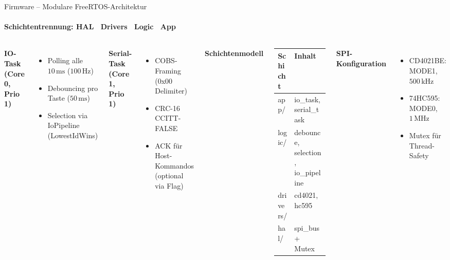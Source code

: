 \begin{frame}{Firmware -- Modulare FreeRTOS-Architektur}
\framesubtitle{Schichtentrennung: HAL \textbullet\ Drivers \textbullet\ Logic \textbullet\ App}

\begin{columns}[T,onlytextwidth]
\textbf{\textcolor{ArduinoTeal}{IO-Task} (Core 0, Prio 1)}
\begin{itemize}
  \item Polling alle $10\,\mathrm{ms}$ ($100\,\mathrm{Hz}$)
  \item Debouncing pro Taste ($50\,\mathrm{ms}$)
  \item Selection via IoPipeline (LowestIdWins)
\end{itemize}

\vspace{0.3cm}
\textbf{\textcolor{ArduinoDark}{Serial-Task} (Core 1, Prio 1)}
\begin{itemize}
  \item COBS-Framing (0x00 Delimiter)
  \item CRC-16 CCITT-FALSE
  \item ACK f\"{u}r Host-Kommandos (optional via Flag)
\end{itemize}

\textbf{Schichtenmodell}
\begin{table}
\small
\begin{tabular}{@{}ll@{}}
\toprule
\textbf{Schicht} & \textbf{Inhalt} \\
\midrule
\textcolor{ArduinoTeal}{app/} & io\_task, serial\_task \\
\textcolor{ArduinoDark}{logic/} & debounce, selection, io\_pipeline \\
\textcolor{RaspberryRed}{drivers/} & cd4021, hc595 \\
\textcolor{SuccessGreen}{hal/} & spi\_bus + Mutex \\
\bottomrule
\end{tabular}
\end{table}

\vspace{0.2cm}
\textbf{SPI-Konfiguration}
\begin{itemize}
  \item CD4021BE: MODE1, $500\,\mathrm{kHz}$
  \item 74HC595: MODE0, $1\,\mathrm{MHz}$
  \item Mutex f\"{u}r Thread-Safety
\end{itemize}
\end{columns}
\end{frame}

